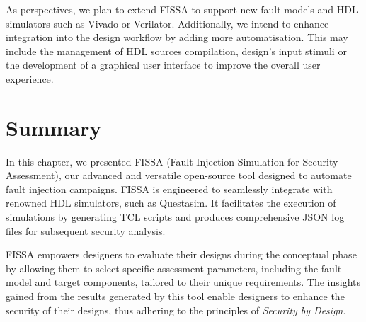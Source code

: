 As perspectives, we plan to extend FISSA to support new fault models and HDL simulators such as Vivado or Verilator.
Additionally, we intend to enhance integration into the design workflow by adding more automatisation. This may include the management of HDL sources compilation, design's input stimuli or the development of a graphical user interface to improve the overall user experience.
\section{Summary}
In this chapter, we presented FISSA (Fault Injection Simulation for Security Assessment), our advanced and versatile open-source tool designed to automate fault injection campaigns. FISSA is engineered to seamlessly integrate with renowned HDL simulators, such as Questasim. It facilitates the execution of simulations by generating TCL scripts and produces comprehensive JSON log files for subsequent security analysis.

FISSA empowers designers to evaluate their designs during the conceptual phase by allowing them to select specific assessment parameters, including the fault model and target components, tailored to their unique requirements. The insights gained from the results generated by this tool enable designers to enhance the security of their designs, thus adhering to the principles of \textit{Security by Design}.


